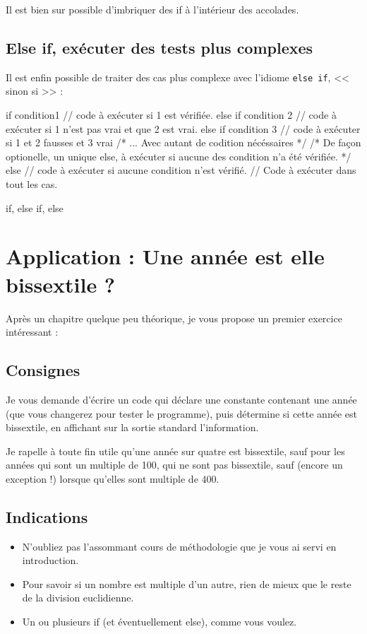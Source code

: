 Il est bien sur possible d'imbriquer des if à l'intérieur des accolades.
\subsection{Else if, exécuter des tests plus complexes}
Il est enfin possible de traiter des cas plus complexe avec l'idiome \texttt{else if}, << sinon si >> :
\begin{listing}[h]
if condition1 {
    // code à exécuter si 1 est vérifiée.
}
else if condition 2
{
    // code à exécuter si 1 n'est pas vrai et que 2 est vrai.
} else if condition 3 {
    // code à exécuter si 1 et 2 fausses et 3 vrai 
}
/* ... Avec autant de codition nécéssaires */
/* De façon optionelle, un unique else, à exécuter si aucune des condition n'a été vérifiée. */
else {
    // code à exécuter si aucune  condition n'est vérifié.
}
// Code à exécuter dans tout les cas.

\caption{if, else if, else}
\end{listing}
\section{Application : Une année est elle bissextile ?}
Après un chapitre quelque peu théorique, je vous propose un premier exercice intéressant :
\subsection{Consignes}
Je vous demande d'écrire un code qui déclare une constante contenant une année
(que vous changerez pour tester le programme),
puis détermine si cette année est bissextile,
en affichant sur la sortie standard l'information.

Je rapelle à toute fin utile qu'une année sur quatre est bissextile, sauf pour les années qui sont un multiple de 100, qui ne sont pas bissextile, sauf (encore un exception !) lorsque qu'elles sont multiple de 400.
\subsection{Indications}
\begin{itemize}

\item N'oubliez pas l'assommant cours de méthodologie que je vous ai servi en introduction.

\item Pour savoir si un nombre est multiple d'un autre,
rien de mieux que le reste de la division euclidienne.

\item Un ou plusieurs if (et éventuellement else), comme vous voulez.
\end{itemize}
\pagebreak %
